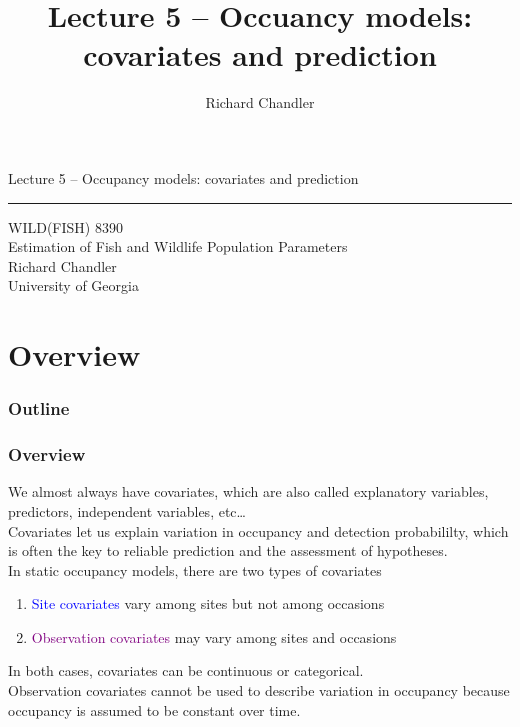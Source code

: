 \documentclass[color=usenames,dvipsnames]{beamer}\usepackage[]{graphicx}\usepackage[]{color}
\title{Lecture 5 -- Occuancy models: covariates and prediction }
\author{Richard Chandler}
\begin{document}
\begin{frame}[plain]
  \LARGE
  \centering
  {\huge Lecture 5 -- Occupancy models: covariates and prediction} \\
  {\color{default} \rule{\textwidth}{0.1pt}}
  \vfill
  \large
  WILD(FISH) 8390 \\
  Estimation of Fish and Wildlife Population Parameters \\
  \vfill
  \large
  Richard Chandler \\
  University of Georgia \\
\end{frame}






\section{Overview}



\begin{frame}[plain]
  \frametitle{Outline}
  \Large
\end{frame}



\begin{frame}
  \frametitle{Overview}
  We almost always have covariates, which are also called explanatory
  variables, predictors, independent variables, etc\dots \\
  \pause
  \vfill
  Covariates let us explain variation in occupancy and detection
  probabililty, which is often the key to reliable prediction and the
  assessment of hypotheses. \\
  \pause
  \vfill
  In static occupancy models, there are two types of covariates
  \begin{enumerate}
    \item \textcolor{blue}{Site covariates} vary among sites
      but not among occasions
    \item \textcolor{purple}{Observation covariates} may vary among
      sites and occasions
  \end{enumerate}
  \pause
  \vfill
  In both cases, covariates can be continuous or categorical. \\
  \pause
  \vfill
  Observation covariates cannot be used to describe variation in
  occupancy because occupancy is assumed to be constant over time.
\end{frame}
\end{document}
